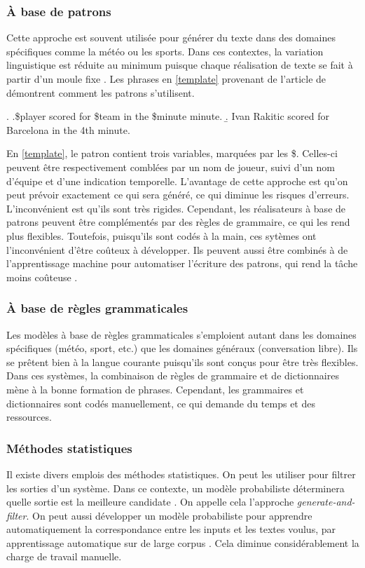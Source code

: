 \subsubsection{À base de patrons}
Cette approche est souvent utilisée pour générer du texte dans des domaines spécifiques comme la météo ou les sports. Dans ces contextes, la variation linguistique est réduite au minimum puisque chaque réalisation de texte se fait à partir d'un moule fixe \citep{mcroy_channarukul_ali_2003}. Les phrases en \ref{template} provenant de l'article de \cite{gatt18} démontrent comment les patrons s'utilisent.

\ex. \label{template}
	\a.\$player scored for \$team in the \$minute minute. 
	\b. Ivan Rakitic scored for Barcelona in the 4th minute.

En \ref{template}, le patron contient trois variables, marquées par les \$. Celles-ci peuvent être respectivement comblées par un nom de joueur, suivi d'un nom d'équipe et d'une indication temporelle. L'avantage de cette approche est qu'on peut prévoir exactement ce qui sera généré, ce qui diminue les risques d'erreurs. L'inconvénient est qu'ils sont très rigides. Cependant, les réalisateurs à base de patrons peuvent être complémentés par des règles de grammaire, ce qui les rend plus flexibles. Toutefois, puisqu'ils sont codés à la main, ces sytèmes ont l'inconvénient d'être coûteux à développer. Ils peuvent aussi être combinés à de l'apprentissage machine pour automatiser l'écriture des patrons, qui rend la tâche moins coûteuse \citep{gatt18}.

\subsubsection{À base de règles grammaticales}
Les modèles à base de règles grammaticales s'emploient autant dans les domaines spécifiques (météo, sport, etc.) que les domaines généraux (conversation libre). Ils se prêtent bien à la langue courante puisqu'ils sont conçus pour être très flexibles. Dans ces systèmes, la combinaison de règles de grammaire et de dictionnaires mène à la bonne formation de phrases. Cependant, les grammaires et dictionnaires sont codés manuellement, ce qui demande du temps et des ressources.

\subsubsection{Méthodes statistiques}
Il existe divers emplois des méthodes statistiques. On peut les utiliser pour filtrer les sorties d'un système. Dans ce contexte, un modèle probabiliste déterminera quelle sortie est la meilleure candidate \citep{LangkildeForestbasedStatisticalSentence2000}. On appelle cela l'approche \emph{generate-and-filter}. On peut aussi développer un modèle probabiliste pour apprendre automatiquement la correspondance entre les inputs et les textes voulus,  par apprentissage automatique sur de large corpus \citep{WhiteMinimalDependencyLength2012}. Cela diminue considérablement la charge de travail manuelle.

